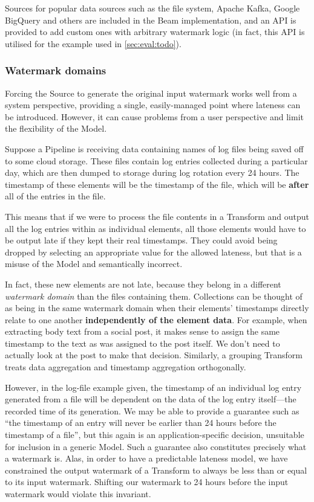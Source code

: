 Sources for popular data sources such as the file system, Apache Kafka, Google BigQuery and others are included in the Beam implementation, and an API is provided to add custom ones with arbitrary watermark logic (in fact, this API is utilised for the example used in \cref{sec:eval:todo}).

\subsubsection{Watermark domains}

Forcing the Source to generate the original input watermark works well from a system perspective, providing a single, easily-managed point where lateness can be introduced.
However, it can cause problems from a user perspective and limit the flexibility of the Model.

Suppose a Pipeline is receiving data containing names of log files being saved off to some cloud storage.
These files contain log entries collected during a particular day, which are then dumped to storage during log rotation every 24 hours.
The timestamp of these elements will be the timestamp of the file, which will be \textbf{after} all of the entries in the file.

This means that if we were to process the file contents in a Transform and output all the log entries within as individual elements, all those elements would have to be output late if they kept their real timestamps.
They could avoid being dropped by selecting an appropriate value for the allowed lateness, but that is a misuse of the Model and semantically incorrect.

In fact, these new elements are not late, because they belong in a different \emph{watermark domain} than the files containing them.
Collections can be thought of as being in the same watermark domain when their elements' timestamps directly relate to one another \textbf{independently of the element data}.
For example, when extracting body text from a social post, it makes sense to assign the same timestamp to the text as was assigned to the post itself.
We don't need to actually look at the post to make that decision.
Similarly, a grouping Transform treats data aggregation and timestamp aggregation orthogonally.


However, in the log-file example given, the timestamp of an individual log entry generated from a file will be dependent on the data of the log entry itself---the recorded time of its generation.
We may be able to provide a guarantee such as ``the timestamp of an entry will never be earlier than 24 hours before the timestamp of a file'', but this again is an application-specific decision, unsuitable for inclusion in a generic Model.
Such a guarantee also constitutes precisely what a watermark is.
Alas, in order to have a predictable lateness model, we have constrained the output watermark of a Transform to always be less than or equal to its input watermark.
Shifting our watermark to 24 hours before the input watermark would violate this invariant.


